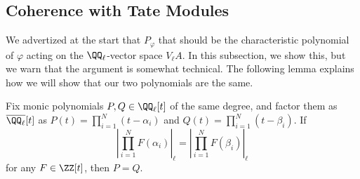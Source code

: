 \documentclass{amsart}
\begin{document}
\subsection{Coherence with Tate Modules}
We advertized at the start that $P_\varphi$ that should be the characteristic polynomial of $\varphi$ acting on the $\QQ_\ell$-vector space $V_\ell A$. In this subsection, we show this, but we warn that the argument is somewhat technical. The following lemma explains how we will show that our two polynomials are the same.
\begin{lemma} \label{lem:get-poly-eq}
	Fix monic polynomials $P,Q\in\QQ_\ell[t]$ of the same degree, and factor them as $\overline{\QQ_\ell}[t]$ as $P(t)=\prod_{i=1}^N(t-\alpha_i)$ and $Q(t)=\prod_{i=1}^N(t-\beta_i)$. If
	\[\left|\prod_{i=1}^NF(\alpha_i)\right|_\ell=\left|\prod_{i=1}^NF(\beta_i)\right|_\ell\]
	for any $F\in\ZZ[t]$, then $P=Q$.
\end{lemma}
\end{document}
